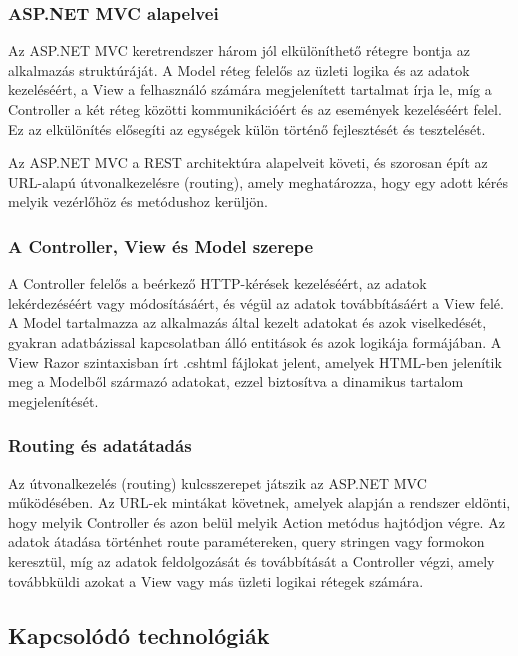 \subsubsection{ASP.NET MVC alapelvei}

\indent Az ASP.NET MVC keretrendszer három jól elkülöníthető rétegre bontja az alkalmazás struktúráját. A Model réteg felelős az üzleti logika és az adatok kezeléséért, a View a felhasználó számára megjelenített tartalmat írja le, míg a Controller a két réteg közötti kommunikációért és az események kezeléséért felel. Ez az elkülönítés elősegíti az egységek külön történő fejlesztését és tesztelését.

Az ASP.NET MVC a REST architektúra alapelveit követi, és szorosan épít az URL-alapú útvonalkezelésre (routing), amely meghatározza, hogy egy adott kérés melyik vezérlőhöz és metódushoz kerüljön.

\subsubsection{A Controller, View és Model szerepe}

\indent A Controller felelős a beérkező HTTP-kérések kezeléséért, az adatok lekérdezéséért vagy módosításáért, és végül az adatok továbbításáért a View felé. A Model tartalmazza az alkalmazás által kezelt adatokat és azok viselkedését, gyakran adatbázissal kapcsolatban álló entitások és azok logikája formájában. A View Razor szintaxisban írt .cshtml fájlokat jelent, amelyek HTML-ben jelenítik meg a Modelből származó adatokat, ezzel biztosítva a dinamikus tartalom megjelenítését.

\subsubsection{Routing és adatátadás}

\indent Az útvonalkezelés (routing) kulcsszerepet játszik az ASP.NET MVC működésében. Az URL-ek mintákat követnek, amelyek alapján a rendszer eldönti, hogy melyik Controller és azon belül melyik Action metódus hajtódjon végre. Az adatok átadása történhet route paramétereken, query stringen vagy formokon keresztül, míg az adatok feldolgozását és továbbítását a Controller végzi, amely továbbküldi azokat a View vagy más üzleti logikai rétegek számára.

\subsection{Kapcsolódó technológiák}

